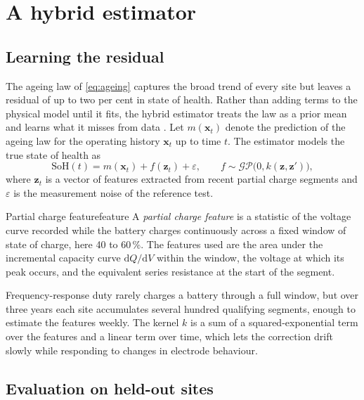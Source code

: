 \chapter{A hybrid estimator}
\label{ch:estimation}

\section{Learning the residual}
\label{sec:residual}

The ageing law of \cref{eq:ageing} captures the broad trend of every site
but leaves a residual of up to two per cent in state of health. Rather
than adding terms to the physical model until it fits, the hybrid
estimator treats the law as a prior mean and learns what it misses from
data \parencite{rasmussen2006gp}. Let \(m(\mathbf{x}_t)\) denote the prediction of the ageing law for
the operating history \(\mathbf{x}_t\) up to time \(t\). The estimator
models the true state of health as
\begin{equation}
  \mathrm{SoH}(t) = m(\mathbf{x}_t) + f(\mathbf{z}_t) + \varepsilon,
  \qquad f \sim \mathcal{GP}\bigl(0, k(\mathbf{z}, \mathbf{z}')\bigr),
  \label{eq:hybrid}
\end{equation}
where \(\mathbf{z}_t\) is a vector of features extracted from recent
partial charge segments and \(\varepsilon\) is the measurement noise of
the reference test.

\begin{definition}{Partial charge feature}{feature}
  A \emph{partial charge feature} is a statistic of the voltage curve
  recorded while the battery charges continuously across a fixed
  window of state of charge, here 40 to 60\,\%. The features used are the
  area under the incremental capacity curve \(\mathrm{d}Q/\mathrm{d}V\)
  within the window, the voltage at which its peak occurs, and the
  equivalent series resistance at the start of the segment.
\end{definition}

Frequency-response duty rarely charges a battery through a full window,
but over three years each site accumulates several hundred qualifying
segments, enough to estimate the features weekly. The kernel \(k\) is a
sum of a squared-exponential term over the features and a linear term
over time, which lets the correction drift slowly while responding to
changes in electrode behaviour.

\section{Evaluation on held-out sites}
\label{sec:evaluation}

